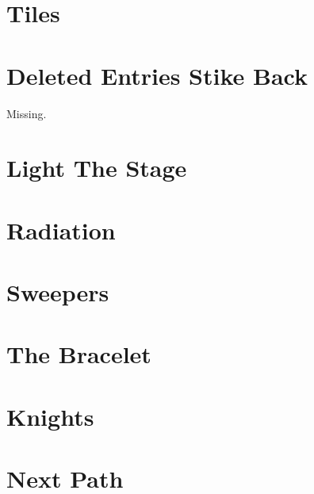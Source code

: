 \documentclass[a4paper, 10pt]{article}
\let\stdsection\section
\renewcommand\section{\newpage\stdsection}
\newcommand{\includecode}[1]{
    }
\newcommand{\algoAuthor}{2} %
\begin{document}
    \section{Tiles}
        \label{sec:tiles}
        \includecode{../problems/w11/Tiles/Tiles\algoAuthor.cpp}
        
    
    \section{Deleted Entries Stike Back}
        \label{sec:deleted_entries_strike_back}
        Missing.
        
    \section{Light The Stage}
        \label{sec:light_the_stage}
        \includecode{../problems/w12/Light_The_Stage/LightTheStage\algoAuthor.cpp}
        
    \section{Radiation}
        \label{sec:radiation}
        \includecode{../problems/w12/Radiation/Radiation\algoAuthor.cpp}
        
    \section{Sweepers}
        \label{sec:sweepers}
        \includecode{../problems/w12/Sweepers/Sweepers\algoAuthor.cpp}
        
    \section{The Bracelet}
        \label{sec:the_bracelet}
        \includecode{../problems/w12/The_Bracelet/TheBracelet\algoAuthor.cpp}
        
    
    \section{Knights}
        \label{sec:knights}
        \includecode{../problems/w13/Knights/Knights\algoAuthor.cpp}
        
    \section{Next Path}
        \label{sec:next_path}
        \includecode{../problems/w13/NextPath/NextPath\algoAuthor.cpp}
        
\end{document}
